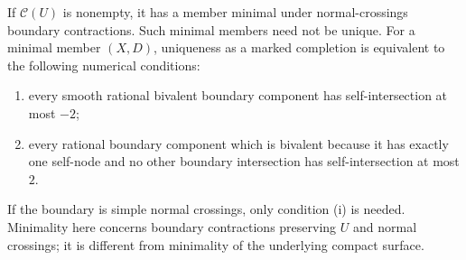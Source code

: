 \begin{theorem}\label{P3a-minimal}
If $\mathcal C(U)$ is nonempty, it has a member minimal under normal-crossings
boundary contractions.  Such minimal members need not be unique.
For a minimal member $(X,D)$, uniqueness as a marked completion is equivalent
to the following numerical conditions:
\begin{enumerate}[label=(\roman*)]
\item every smooth rational bivalent boundary component has self-intersection
at most $-2$;
\item every rational boundary component which is bivalent because it has exactly
one self-node and no other boundary intersection has self-intersection at most $2$.
\end{enumerate}
If the boundary is simple normal crossings, only condition (i) is needed.
Minimality here concerns boundary contractions preserving $U$ and normal
crossings; it is different from minimality of the underlying compact surface.
\end{theorem}

